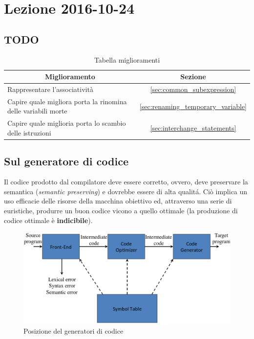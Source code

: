 \section{Lezione 2016-10-24}
\subsection{TODO}
\begin{table}[H]
\begin{center}
\begin{tabular}{|p{\textwidth}|c|}
\hline
\multicolumn{1}{|c|}{\textbf{Miglioramento}} & \textbf{Sezione} \\ \hline
Rappresentare l'associativit\`a & \ref{sec:common_subexpression} \\ \hline
Capire quale migliora porta la rinomina delle variabili morte &
\ref{sec:renaming_temporary_variable} \\ \hline
Capire quale miglioria porta lo scambio delle istruzioni &
\ref{sec:interchange_statements} \\ \hline
\end{tabular}
\end{center}
\caption{Tabella miglioramenti}
\label{tab:tab_todo}
\end{table}

\subsection{Sul generatore di codice}
Il codice prodotto dal compilatore deve essere corretto, ovvero, deve
preservare la semantica (\textit{semantic preserving}) e dovrebbe essere di
alta qualit\'a. Ci\`o implica un uso efficacie delle risorse della macchina
obiettivo ed, attraverso una serie di euristiche, produrre un buon codice
vicono a quello ottimale (la produzione di codice ottimale \`e
\textbf{indicibile}).

\begin{figure}[H]
  \centering
  \includegraphics[scale=0.4]{res/image/code_generator_position}
  \caption{Posizione del generatori di codice}
  \label{img:code_generator_position}
\end{figure}

